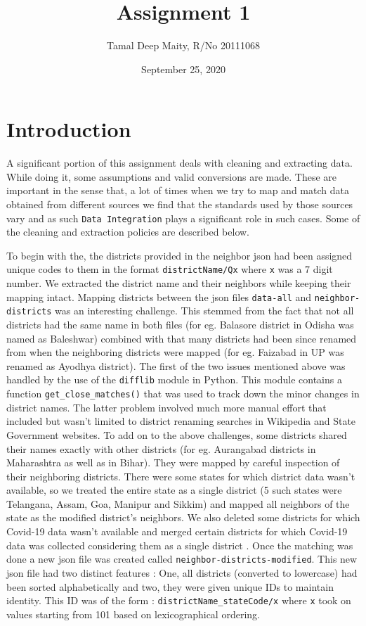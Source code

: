 \documentclass[letterpaper,12pt]{article}
\begin{document}
\title{Assignment 1}
\author{Tamal Deep Maity, R/No 20111068}
\date {September 25, 2020}
\maketitle


\section{Introduction}

A significant portion of this assignment deals with cleaning and extracting data. While doing it, some assumptions and valid conversions are made. These are important in the sense that, a lot of times when we try to map and match data obtained from different sources we find that the standards used by those sources vary and as such \verb|Data Integration| plays a significant role in such cases. Some of the cleaning and extraction policies are described below. 

To begin with the, the districts provided in the neighbor json had been assigned unique codes to them in the format \verb|districtName/Qx| where \verb|x| was a 7 digit number. We extracted the district name and their neighbors while keeping their mapping intact. Mapping districts between the json files \verb|data-all|  and   \verb|neighbor-districts|  was an interesting challenge. This stemmed from the fact that not all districts had the same name in both files (for eg. Balasore district in Odisha was named as Baleshwar) combined with that many districts had been since renamed from when the neighboring districts were mapped (for eg. Faizabad in UP was renamed as Ayodhya district). The first of the two issues mentioned above was handled by the use of the \verb|difflib| module in Python. This module contains a function \verb|get_close_matches()| that was used to track down the minor changes in district names. The latter problem involved much more manual effort that included but wasn't limited to district renaming searches in Wikipedia and State Government websites. To add on to the above challenges, some districts shared their names exactly with other districts (for eg. Aurangabad districts in Maharashtra as well as in Bihar). They were mapped by careful inspection of their neighboring districts. There were some states for which district data wasn't available, so we treated the entire state as a single district (5 such states were Telangana, Assam, Goa, Manipur and Sikkim) and mapped all neighbors of the state as the modified district's neighbors. We also deleted some districts for which Covid-19 data wasn't available and merged certain districts for which Covid-19 data was collected considering them as a single district . Once the matching was done a new json file was created called  \verb|neighbor-districts-modified|. This new json file had two distinct features : One, all districts (converted to lowercase) had been sorted alphabetically and two, they were given unique IDs to maintain identity. This ID was of the form : \verb|districtName_stateCode/x| where \verb|x| took on values starting from 101 based on lexicographical ordering. 
\end{document}
